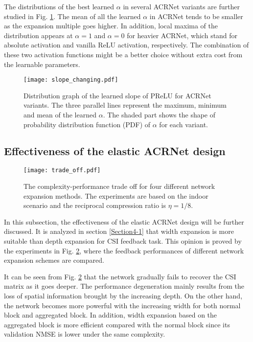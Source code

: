 \documentclass[12pt, draftclsnofoot, onecolumn]{IEEEtran}
\begin{document}
The distributions of the best learned $\alpha$ in several ACRNet variants are further studied in Fig. \ref{Slope Distribution}. The mean of all the learned $\alpha$ in ACRNet tends to be smaller as the expansion multiple goes higher. In addition, local maxima of the distribution appears at $\alpha=1$ and $\alpha=0$ for heavier ACRNet, which stand for absolute activation and vanilla ReLU activation, respectively. The combination of these two activation functions might be a better choice without extra cost from the learnable parameters.

\begin{figure}[!t]
\centering
\texttt{[image: slope\_changing.pdf]}
\caption{Distribution graph of the learned slope of PReLU for ACRNet variants. The three parallel lines represent the maximum, minimum and mean of the learned $\alpha$. The shaded part shows the shape of probability distribution function (PDF) of $\alpha$ for each variant.}
\label{Slope Distribution}
\end{figure}

\subsection{Effectiveness of the elastic ACRNet design} \label{Section5-4}

\begin{figure}[!b]
\centering
\texttt{[image: trade\_off.pdf]}
\caption{The complexity-performance trade off for four different network expansion methods. The experiments are based on the indoor scenario and the reciprocal compression ratio is $\eta=1/8$.}
\label{Trade off}
\end{figure}

In this subsection, the effectiveness of the elastic ACRNet design will be further discussed. It is analyzed in section \ref{Section4-1} that width expansion is more suitable than depth expansion for CSI feedback task. This opinion is proved by the experiments in Fig. \ref{Trade off}, where the feedback performances of different network expansion schemes are compared.

It can be seen from Fig. \ref{Trade off} that the network gradually fails to recover the CSI matrix as it goes deeper. The performance degeneration mainly results from the loss of spatial information brought by the increasing depth. On the other hand, the network becomes more powerful with the increasing width for both normal block and aggregated block. In addition, width expansion based on the aggregated block is more efficient compared with the normal block since its validation NMSE is lower under the same complexity.
\end{document}
